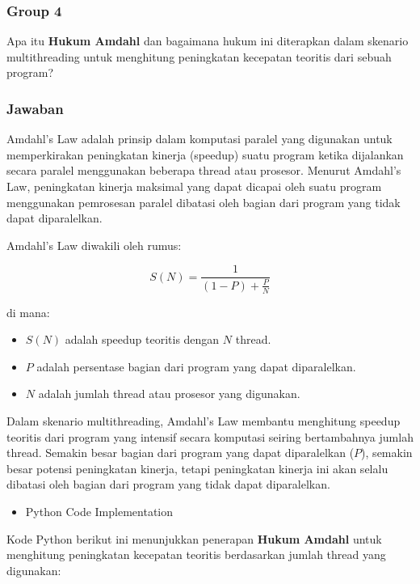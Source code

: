 \documentclass[12pt]{article}
\begin{document}
\subsubsection{Group 4}
Apa itu \textbf{Hukum Amdahl} dan bagaimana hukum ini diterapkan dalam skenario multithreading untuk menghitung peningkatan kecepatan teoritis dari sebuah program?

\subsubsection{Jawaban}
Amdahl's Law adalah prinsip dalam komputasi paralel yang digunakan untuk memperkirakan peningkatan kinerja (speedup) suatu program ketika dijalankan secara paralel menggunakan beberapa thread atau prosesor. Menurut Amdahl's Law, peningkatan kinerja maksimal yang dapat dicapai oleh suatu program menggunakan pemrosesan paralel dibatasi oleh bagian dari program yang tidak dapat diparalelkan.

Amdahl's Law diwakili oleh rumus:

\[
S(N) = \frac{1}{(1 - P) + \frac{P}{N}}
\]

di mana:
\begin{itemize}
    \item $S(N)$ adalah speedup teoritis dengan $N$ thread.
    \item $P$ adalah persentase bagian dari program yang dapat diparalelkan.
    \item $N$ adalah jumlah thread atau prosesor yang digunakan.
\end{itemize}

Dalam skenario multithreading, Amdahl's Law membantu menghitung speedup teoritis dari program yang intensif secara komputasi seiring bertambahnya jumlah thread. Semakin besar bagian dari program yang dapat diparalelkan ($P$), semakin besar potensi peningkatan kinerja, tetapi peningkatan kinerja ini akan selalu dibatasi oleh bagian dari program yang tidak dapat diparalelkan.

\begin{itemize}
    \item {Python Code Implementation}
\end{itemize}

Kode Python berikut ini menunjukkan penerapan \textbf{Hukum Amdahl} untuk menghitung peningkatan kecepatan teoritis berdasarkan jumlah thread yang digunakan:
\end{document}
